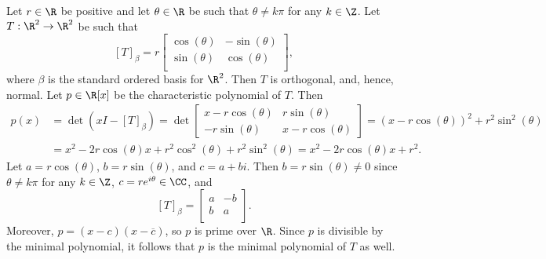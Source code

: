 \documentclass[linearalgebra]{subfiles}
\begin{document}
    \begin{example}
        Let $r\in\R$ be positive and let $\theta\in\R$ be such that $\theta\neq k\pi$ for any $k\in\Z$. Let $T:\R^2\to\R^2$ be such that
        \begin{equation*}
            \left[ T \right] _\beta = r 
            \begin{bmatrix}
                \cos(\theta) & - \sin(\theta) \\
                \sin(\theta) & \cos(\theta) \\
            \end{bmatrix},
        \end{equation*}
        where $\beta$ is the standard ordered basis for $\R^2$. Then $T$ is orthogonal, and, hence, normal. Let $p\in\R[x]$ be the characteristic polynomial of $T$. Then
        \begin{align*}
            p(x) & = \det\left( xI-\left[ T \right] _\beta \right) = \det\begin{bmatrix} x-r\cos(\theta) & r\sin(\theta) \\ -r\sin(\theta) & x-r\cos(\theta) \end{bmatrix} = \left( x-r\cos(\theta) \right) ^2 + r^{2} \sin^{2} (\theta) \\
            & = x^2 - 2r\cos(\theta)x + r^{2} \cos^{2} (\theta) + r^{2}\sin^2(\theta) = x^2-2r\cos(\theta)x+r^2.
        \end{align*} 
        Let $a=r\cos(\theta)$, $b=r\sin(\theta)$, and $c=a+bi$. Then $b=r\sin(\theta)\neq 0$ since $\theta\neq k\pi$ for any $k\in\Z$, $c=re^{i\theta}\in\CC$, and
        \begin{equation*}
            \left[ T \right] _\beta = 
            \begin{bmatrix}
                a & -b\\
                b & a\\
            \end{bmatrix}.
        \end{equation*}
        Moreover, $p=(x-c)(x-\overline{c} )$, so $p$ is prime over $\R$. Since $p$ is divisible by the minimal polynomial, it follows that $p$ is the minimal polynomial of $T$ as well.
    \end{example}
\end{document}
